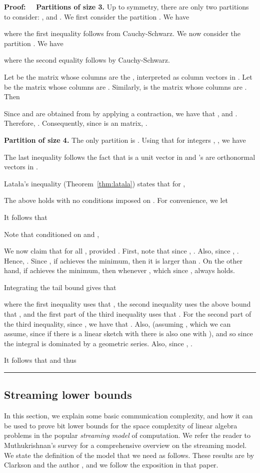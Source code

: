 \documentclass[11pt]{article}
\newenvironment{proof}{\begin{trivlist} \item {\bf Proof:~~}}
  {\qed\end{trivlist}}
\def\qed{\hfill\rule{2mm}{2mm}}
\begin{document}
\begin{proof}
\noindent\textbf{Partitions of size 3.} Up to symmetry, there are only two partitions to consider:
, and . We first consider the partition . We have

where the first inequality follows from Cauchy-Schwarz. We now consider the partition . We have

where the second equality follows by Cauchy-Schwarz.

Let  be the  matrix whose columns are the , interpreted as column vectors in . 
Let  be the  matrix whose columns are . 
Similarly,  is the  matrix whose columns are . Then 

Since  and  are obtained from  by applying a contraction, we have that
, and 
. Therefore, . Consequently, 
since  is an  matrix, . 

\noindent\textbf{Partition of size 4.}
The only partition is . Using that for integers , , we have

The last inequality follows the fact that  is a unit vector in  and 's are orthonormal vectors in .

Lata{\l}a's inequality (Theorem~\ref{thm:latala}) states that for , 

The above holds with no conditions imposed on . For convenience, we let 

It follows that

Note that conditioned on  and ,


We now claim that  for all , provided . First, note
that since , . Also, since , . 
Hence, . Since , if  achieves the minimum, then it is larger
than . On the other hand, if  achieves the minimum, then  whenever
, which since , always holds. 

Integrating the tail bound gives that

where the first inequality uses that , the second
inequality uses the above bound that , and the first part of the third inequality uses that . For
the second part of the third inequality, since , we have that . Also, 
 (assuming , which we can assume, since if there is a linear sketch with  
there is also one with ), and so  since the integral is dominated by a geometric
series. Also, since , . 

It follows that  and thus 

\end{proof}

\subsection{Streaming lower bounds}\label{sec:streaming}
In this section, we explain some basic communication complexity,
and how it can be used to prove bit lower bounds for the space
complexity of linear algebra problems in the popular {\it streaming model} of computation.
We refer the reader to Muthukrishnan's survey \cite{m05} for a comprehensive overview on the streaming
model. We state the definition of the model that we need as follows. These results are by Clarkson
and the author \cite{CW09}, and we follow the exposition in that paper.
\end{document}
